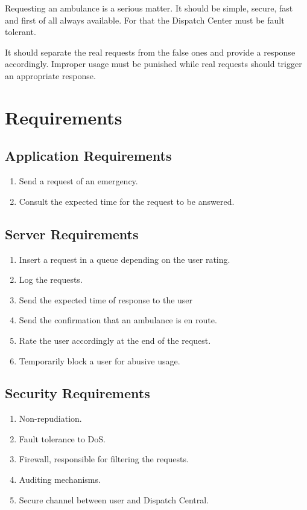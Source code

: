 \documentclass[a4paper,titlepage,11pt]{article}
\begin{document}
Requesting an ambulance is a serious matter.
It should be simple, secure, fast and first of all always available.
For that the Dispatch Center must be fault tolerant.

It should separate the real requests from the false ones and provide a response accordingly.
Improper usage must be punished while real requests should trigger an appropriate response.

\section{Requirements}

\subsection{Application Requirements}
\begin{enumerate}
  \item Send a request of an emergency.
  \item Consult the expected time for the request to be answered.
\end{enumerate}

\subsection{Server Requirements}
\begin{enumerate}
  \item Insert a request in a queue depending on the user rating.
  \item Log the requests.
  \item Send the expected time of response to the user
  \item Send the confirmation that an ambulance is en route.
  \item Rate the user accordingly at the end of the request.
  \item Temporarily block a user for abusive usage.
\end{enumerate}

\subsection{Security Requirements}
\begin{enumerate}
  \item Non-repudiation.
  \item Fault tolerance to DoS.
  \item Firewall, responsible for filtering the requests.
  \item Auditing mechanisms.
  \item Secure channel between user and Dispatch Central.
\end{enumerate}
\end{document}
